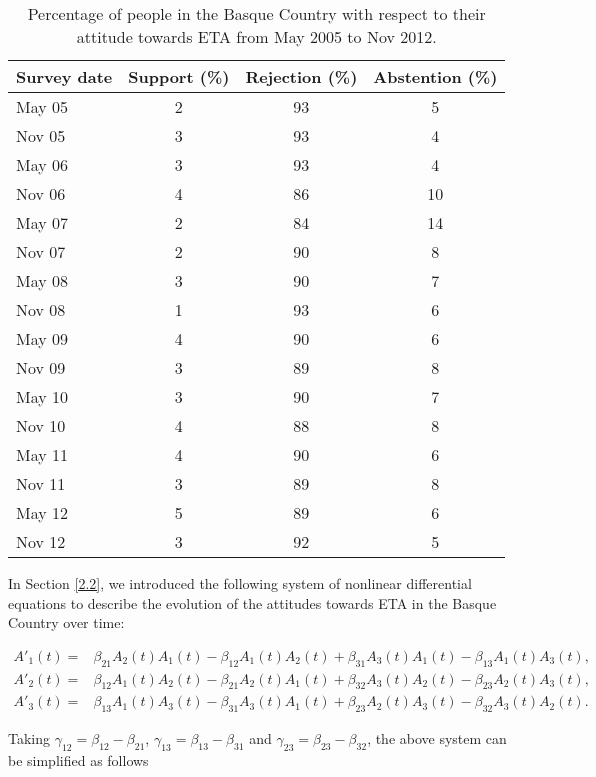 \begin{table}[h]
\centering
\begin{tabular}{|l|c|c|c|}
\hline
  Survey date  & Support (\%) & Rejection (\%) & Abstention (\%) \\ 
\hline
May 05	&	2	&	93	&	5	\\
Nov 05	&	3	&	93	&	4	\\
May 06	&	3	&	93	&	4	\\
Nov 06	&	4	&	86	&	10	\\
May 07	&	2	&	84	&	14	\\
Nov 07	&	2	&	90	&	8	\\
May 08	&	3	&	90	&	7	\\
Nov 08	&	1	&	93	&	6	\\
May 09	&	4	&	90	&	6	\\
Nov 09	&	3	&	89	&	8	\\
May 10	&	3	&	90	&	7	\\
Nov 10	&	4	&	88	&	8	\\
May 11	&	4	&	90	&	6	\\
Nov 11	&	3	&	89	&	8	\\
May 12	&	5	&	89	&	6	\\
Nov 12	&	3	&	92	&	5	\\
 \hline 
\end{tabular} 
\caption{Percentage of people in the Basque Country with respect to their attitude towards ETA from May 2005 to Nov 2012.}
\label{c3TABLA1} 
\end{table}

In Section \ref{2.2}, we introduced the following system of nonlinear differential equations to describe the evolution of the attitudes towards ETA in the Basque Country over time:

\begin{eqnarray}
A'_1(t) = &  \beta_{21} A_2(t) A_1(t) - \beta_{12} A_1(t) A_2(t) + \beta_{31} A_3(t) A_1(t) - \beta_{13} A_1(t) A_3(t), \nonumber \\
A'_2(t) = &  \beta_{12} A_1(t) A_2(t) - \beta_{21} A_2(t) A_1(t) + \beta_{32} A_3(t) A_2(t) - \beta_{23} A_2(t) A_3(t), \nonumber \\
A'_3(t) = &  \beta_{13} A_1(t) A_3(t) - \beta_{31} A_3(t) A_1(t) + \beta_{23} A_2(t) A_3(t) - \beta_{32} A_3(t) A_2(t). \nonumber
\end{eqnarray} 

Taking $\gamma_{12} = \beta_{12}  - \beta_{21}$, $\gamma_{13} = \beta_{13}  - \beta_{31}$ and $\gamma_{23} = \beta_{23}  - \beta_{32}$, the above system can be simplified as follows

